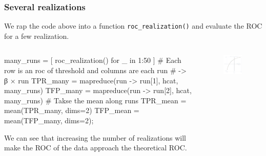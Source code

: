 \documentclass[compress,aspectratio=169]{beamer}
\newcommand\pin{%
\parbox[t]{10pt}{\raisebox{0.2pt}{\usebeamercolor[fg]{mybullet}{$\ast$}}}}
\begin{document}
\begin{frame}[fragile] %
    \frametitle{Several realizations}
    We rap the code above into a function \texttt{roc\_realization()} and evaluate the
    ROC for a few realization. 
    \begin{columns}
        \begin{column}{0.6\textwidth}
            \begin{jllisting}[gobble=16]
                many_runs = [ roc_realization() for _ in 1:50 ]
                # Each row is an roc of threshold and columns are each run
                # -> β × run
                TPR_many = mapreduce(run -> run[1], hcat, many_runs)
                TFP_many = mapreduce(run -> run[2], hcat, many_runs)  
                # Takse the mean along runs
                TPR_mean = mean(TPR_many, dims=2) 
                TFP_mean = mean(TFP_many, dims=2);
            \end{jllisting}
            \pin We can see that increasing the number of realizations will
            make the ROC of the data approach the theoretical ROC.
        \end{column}
        \begin{column}{0.4\textwidth}
            \begin{figure}
                \includegraphics[width=\columnwidth]{"../d2.pdf"}
            \end{figure}
        \end{column}
    \end{columns}
\end{frame}
\end{document}
